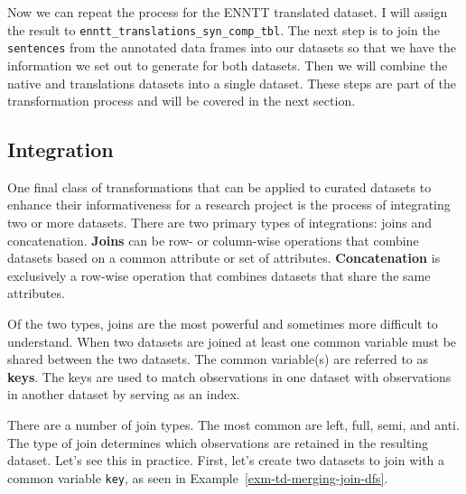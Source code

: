 \documentclass[
  letterpaper,
  DIV=11,
  numbers=noendperiod]{scrreprt}
\theoremstyle{definition}
\theoremstyle{remark}
\begin{document}
Now we can repeat the process for the ENNTT translated dataset. I will
assign the result to \texttt{enntt\_translations\_syn\_comp\_tbl}. The
next step is to join the \texttt{sentences} from the annotated data
frames into our datasets so that we have the information we set out to
generate for both datasets. Then we will combine the native and
translations datasets into a single dataset. These steps are part of the
transformation process and will be covered in the next section.

\subsection{Integration}\label{sec-td-integration}

One final class of transformations that can be applied to curated
datasets to enhance their informativeness for a research project is the
process of integrating two or more datasets. There are two primary types
of integrations: joins and concatenation. \textbf{Joins} can be row- or
column-wise operations that combine datasets based on a common attribute
or set of attributes. \textbf{Concatenation} is exclusively a row-wise
operation that combines datasets that share the same attributes.

Of the two types, joins are the most powerful and sometimes more
difficult to understand. When two datasets are joined at least one
common variable must be shared between the two datasets. The common
variable(s) are referred to as \textbf{keys}. The keys are used to match
observations in one dataset with observations in another dataset by
serving as an index.

There are a number of join types. The most common are left, full, semi,
and anti. The type of join determines which observations are retained in
the resulting dataset. Let's see this in practice. First, let's create
two datasets to join with a common variable \texttt{key}, as seen in
Example~\ref{exm-td-merging-join-dfs}.
\end{document}
